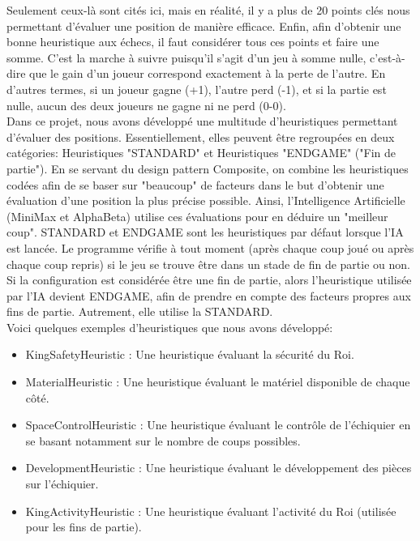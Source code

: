 \documentclass{article}
\begin{document}
Seulement ceux-là sont cités ici, mais en réalité, il y a plus de 20 points clés nous permettant d'évaluer une position de manière efficace.
Enfin, afin d'obtenir une bonne heuristique aux échecs, il faut considérer tous ces points et faire une somme. C'est la marche à suivre puisqu'il 
s'agit d'un jeu à somme nulle, c'est-à-dire que le gain d'un joueur correspond exactement à la perte de l'autre. En d'autres termes, si un joueur gagne 
(+1), l'autre perd (-1), et si la partie est nulle, aucun des deux joueurs ne gagne ni ne perd (0-0). \\
Dans ce projet, nous avons développé une multitude d'heuristiques permettant d'évaluer des positions. Essentiellement, elles peuvent être regroupées
en deux catégories: Heuristiques "STANDARD" et Heuristiques "ENDGAME" ("Fin de partie"). En se servant du design pattern Composite, on combine les
heuristiques codées afin de se baser sur "beaucoup" de facteurs dans le but d'obtenir une évaluation d'une position la plus précise possible. Ainsi,
l'Intelligence Artificielle (MiniMax et AlphaBeta) utilise ces évaluations pour en déduire un "meilleur coup". STANDARD et ENDGAME sont les 
heuristiques par défaut lorsque l'IA est lancée. Le programme vérifie à tout moment (après chaque coup joué ou après chaque coup repris)
si le jeu se trouve être dans un stade de fin de partie ou non. Si la configuration est considérée être une fin de partie, alors l'heuristique utilisée
par l'IA devient ENDGAME, afin de prendre en compte des facteurs propres aux fins de partie. Autrement, elle utilise la STANDARD.\\
Voici quelques exemples d'heuristiques que nous avons développé:
\begin{itemize}
    \item KingSafetyHeuristic : Une heuristique évaluant la sécurité du Roi.
    \item MaterialHeuristic : Une heuristique évaluant le matériel disponible de chaque côté.
    \item SpaceControlHeuristic : Une heuristique évaluant le contrôle de l'échiquier en se basant notamment sur le nombre
    de coups possibles.
    \item DevelopmentHeuristic : Une heuristique évaluant le développement des pièces sur l'échiquier.
    \item KingActivityHeuristic : Une heuristique évaluant l'activité du Roi (utilisée pour les fins de partie).
\end{itemize}
\end{document}
